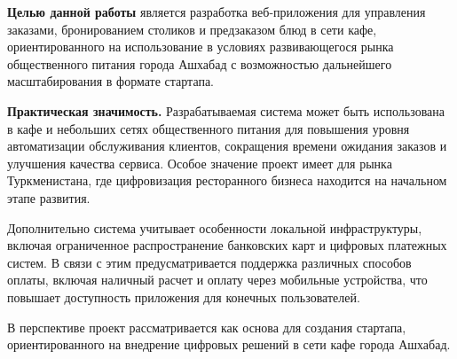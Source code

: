 \textbf{Целью данной работы} является разработка веб-приложения для управления заказами, бронированием столиков и предзаказом блюд в сети кафе, ориентированного на использование в условиях развивающегося рынка общественного питания города Ашхабад с возможностью дальнейшего масштабирования в формате стартапа.

\textbf{Практическая значимость.}  
Разрабатываемая система может быть использована в кафе и небольших сетях общественного питания для повышения уровня автоматизации обслуживания клиентов, сокращения времени ожидания заказов и улучшения качества сервиса. Особое значение проект имеет для рынка Туркменистана, где цифровизация ресторанного бизнеса находится на начальном этапе развития.

Дополнительно система учитывает особенности локальной инфраструктуры, включая ограниченное распространение банковских карт и цифровых платежных систем. В связи с этим предусматривается поддержка различных способов оплаты, включая наличный расчет и оплату через мобильные устройства, что повышает доступность приложения для конечных пользователей.

В перспективе проект рассматривается как основа для создания стартапа, ориентированного на внедрение цифровых решений в сети кафе города Ашхабад.